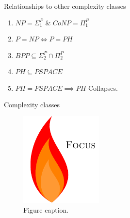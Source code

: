         \begin{frame}{Relationships to other  complexity classes}   
            \begin{enumerate}
                \item $NP = \Sigma_1^P $ $\&$ $ CoNP = \Pi_1^P$
                \pause
                \item $P = NP \iff P = PH$
                \pause
                \item $BPP \subseteq \Sigma_2^P \cap \Pi_2^P $
                \pause
                \item $PH \subseteq PSPACE$
                \pause
                \item $PH = PSPACE \implies PH$ Collapses.
            \end{enumerate}
        \end{frame}
        
        \begin{frame}{Complexity classes}            
            \begin{figure}
                \centering
                \includegraphics{focus-logo.pdf}
                \caption{Figure caption.}
                \label{fig:focuslogo}
            \end{figure}
        \end{frame}